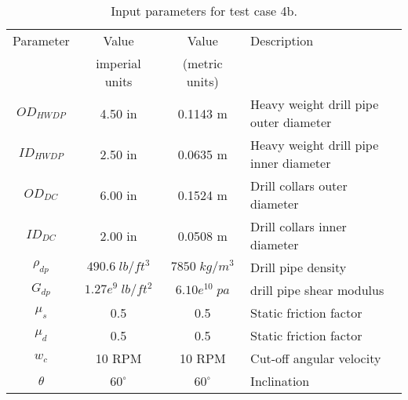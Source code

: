 \begin{table}[h]
\centering
   \begin{tabular}{|c|c|c|p{2.75in}|}
   \hline
   Parameter & Value  & Value & Description\\                                                              
     & imperial units &  (metric units) & \\                                                             
   \hline
   $OD_{HWDP}$ & 4.50 in & 0.1143 m & Heavy weight drill pipe outer diameter \\
   \hline
   $ID_{HWDP}$ & 2.50 in & 0.0635 m & Heavy weight drill pipe inner diameter \\
   \hline
   $OD_{DC}$ & 6.00 in & 0.1524 m & Drill collars outer diameter \\
   \hline
   $ID_{DC}$ & 2.00 in & 0.0508 m & Drill collars inner diameter \\                                                    
   \hline
   $\rho_{dp}$ & $490.6\;lb/ft^3$ & $7850\;kg/m^3$ & Drill pipe density \\                                                  
   \hline
   $G_{dp}$ & $1.27e^{9}\;lb/ft^2$ & $6.10e^{10}\;pa$ & drill pipe shear modulus\\                                                              
   \hline
   $\mu_{s}$ & 0.5 & 0.5 & Static friction factor\\
   \hline
   $\mu_{d}$ & 0.5 & 0.5 & Static friction factor\\
   \hline
   $w_c$ & 10 RPM & 10 RPM & Cut-off angular velocity\\
   \hline
   $\theta$ & $60^{\circ}$ & $60^{\circ}$ & Inclination\\
   \hline
   \end{tabular}
\caption[Input parameters for test case 4b.]{Input parameters for test case 4b.}\label{table_Inclinedwell_4b_input}
\end{table}
